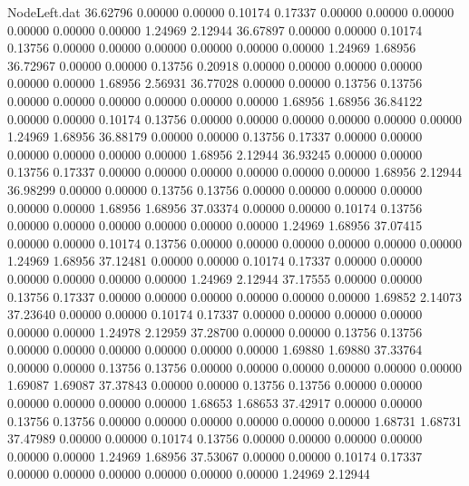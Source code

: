\begin{filecontents}{NodeLeft.dat}
  36.62796    0.00000    0.00000     0.10174    0.17337    0.00000    0.00000    0.00000    0.00000    0.00000    0.00000    1.24969    2.12944
  36.67897    0.00000    0.00000     0.10174    0.13756    0.00000    0.00000    0.00000    0.00000    0.00000    0.00000    1.24969    1.68956
  36.72967    0.00000    0.00000     0.13756    0.20918    0.00000    0.00000    0.00000    0.00000    0.00000    0.00000    1.68956    2.56931
  36.77028    0.00000    0.00000     0.13756    0.13756    0.00000    0.00000    0.00000    0.00000    0.00000    0.00000    1.68956    1.68956
  36.84122    0.00000    0.00000     0.10174    0.13756    0.00000    0.00000    0.00000    0.00000    0.00000    0.00000    1.24969    1.68956
  36.88179    0.00000    0.00000     0.13756    0.17337    0.00000    0.00000    0.00000    0.00000    0.00000    0.00000    1.68956    2.12944
  36.93245    0.00000    0.00000     0.13756    0.17337    0.00000    0.00000    0.00000    0.00000    0.00000    0.00000    1.68956    2.12944
  36.98299    0.00000    0.00000     0.13756    0.13756    0.00000    0.00000    0.00000    0.00000    0.00000    0.00000    1.68956    1.68956
  37.03374    0.00000    0.00000     0.10174    0.13756    0.00000    0.00000    0.00000    0.00000    0.00000    0.00000    1.24969    1.68956
  37.07415    0.00000    0.00000     0.10174    0.13756    0.00000    0.00000    0.00000    0.00000    0.00000    0.00000    1.24969    1.68956
  37.12481    0.00000    0.00000     0.10174    0.17337    0.00000    0.00000    0.00000    0.00000    0.00000    0.00000    1.24969    2.12944
  37.17555    0.00000    0.00000     0.13756    0.17337    0.00000    0.00000    0.00000    0.00000    0.00000    0.00000    1.69852    2.14073
  37.23640    0.00000    0.00000     0.10174    0.17337    0.00000    0.00000    0.00000    0.00000    0.00000    0.00000    1.24978    2.12959
  37.28700    0.00000    0.00000     0.13756    0.13756    0.00000    0.00000    0.00000    0.00000    0.00000    0.00000    1.69880    1.69880
  37.33764    0.00000    0.00000     0.13756    0.13756    0.00000    0.00000    0.00000    0.00000    0.00000    0.00000    1.69087    1.69087
  37.37843    0.00000    0.00000     0.13756    0.13756    0.00000    0.00000    0.00000    0.00000    0.00000    0.00000    1.68653    1.68653
  37.42917    0.00000    0.00000     0.13756    0.13756    0.00000    0.00000    0.00000    0.00000    0.00000    0.00000    1.68731    1.68731
  37.47989    0.00000    0.00000     0.10174    0.13756    0.00000    0.00000    0.00000    0.00000    0.00000    0.00000    1.24969    1.68956
  37.53067    0.00000    0.00000     0.10174    0.17337    0.00000    0.00000    0.00000    0.00000    0.00000    0.00000    1.24969    2.12944

\end{filecontents}
